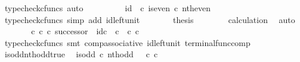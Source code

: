 \begin{isabellebody}
\ {\isacharparenleft}{\kern0pt}typecheck{\isacharunderscore}{\kern0pt}cfuncs{\isacharcomma}{\kern0pt}\ auto{\isacharparenright}{\kern0pt}\isanewline
\ \ \ \ \isamarkupfalse%
\ \isamarkupfalse%
\ {\isachardoublequoteopen}{\isachardot}{\kern0pt}{\isachardot}{\kern0pt}{\isachardot}{\kern0pt}\ {\isacharequal}{\kern0pt}\ id\ {\isasymOmega}\ {\isasymcirc}\isactrlsub c\ is{\isacharunderscore}{\kern0pt}even\ {\isasymcirc}\isactrlsub c\ nth{\isacharunderscore}{\kern0pt}even{\isachardoublequoteclose}\isanewline
\ \ \ \ \ \ \isamarkupfalse%
\ {\isacharparenleft}{\kern0pt}typecheck{\isacharunderscore}{\kern0pt}cfuncs{\isacharcomma}{\kern0pt}\ simp\ add{\isacharcolon}{\kern0pt}\ id{\isacharunderscore}{\kern0pt}left{\isacharunderscore}{\kern0pt}unit{}{\isacharparenright}{\kern0pt}\isanewline
\ \ \ \ \isamarkupfalse%
\ \isamarkupfalse%
\ {\isacharquery}{\kern0pt}thesis\isanewline
\ \ \ \ \ \ \isamarkupfalse%
\ calculation\ \isamarkupfalse%
\ auto\isanewline
\ \ \isamarkupfalse%
\isanewline
\isanewline
\ \ \isamarkupfalse%
\ {\isachardoublequoteopen}{\isacharparenleft}{\kern0pt}{\isasymt}\ {\isasymcirc}\isactrlsub c\ {\isasymbeta}\isactrlbsub {\isasymnat}\isactrlsub c\isactrlesub {\isacharparenright}{\kern0pt}\ {\isasymcirc}\isactrlsub c\ successor\ {\isacharequal}{\kern0pt}\ id\isactrlsub c\ {\isasymOmega}\ {\isasymcirc}\isactrlsub c\ {\isasymt}\ {\isasymcirc}\isactrlsub c\ {\isasymbeta}\isactrlbsub {\isasymnat}\isactrlsub c\isactrlesub {\isachardoublequoteclose}\isanewline
\ \ \ \ \isamarkupfalse%
\ {\isacharparenleft}{\kern0pt}typecheck{\isacharunderscore}{\kern0pt}cfuncs{\isacharcomma}{\kern0pt}\ smt\ comp{\isacharunderscore}{\kern0pt}associative{}\ id{\isacharunderscore}{\kern0pt}left{\isacharunderscore}{\kern0pt}unit{}\ terminal{\isacharunderscore}{\kern0pt}func{\isacharunderscore}{\kern0pt}comp{\isacharparenright}{\kern0pt}\isanewline
{}\isamarkupfalse%
%
\endisatagproof
{\isafoldproof}%
%
\isadelimproof
\isanewline
%
\endisadelimproof
\isanewline
{}\isamarkupfalse%
\ is{\isacharunderscore}{\kern0pt}odd{\isacharunderscore}{\kern0pt}nth{\isacharunderscore}{\kern0pt}odd{\isacharunderscore}{\kern0pt}true{\isacharcolon}{\kern0pt}\isanewline
\ \ {\isachardoublequoteopen}is{\isacharunderscore}{\kern0pt}odd\ {\isasymcirc}\isactrlsub c\ nth{\isacharunderscore}{\kern0pt}odd\ {\isacharequal}{\kern0pt}\ {\isasymt}\ {\isasymcirc}\isactrlsub c\ {\isasymbeta}\isactrlbsub {\isasymnat}\isactrlsub c\isactrlesub {\isachardoublequoteclose}\isanewline

\end{isabellebody}
